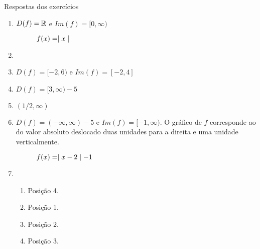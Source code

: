 \begin{frame}[allowframebreaks]{Respostas dos exercícios}
\begin{enumerate}
        \skipframe

        \item $D(f) = \mathbb{R}$ e $Im(f) = [0, \infty)$

        \begin{figure}
        \centering
        \caption{$f(x) = \mid x \mid$}
        \end{figure}

        \item <colocar gráficos>

        \skipframe

        \item $D(f) = [-2, 6)$ e $Im(f) = [-2, 4]$

        \item $D(f) = [3, \infty) - {5}$

        \item $(1/2, \infty)$

        \skipframe

        \item $D(f) = (-\infty, \infty) - {5}$ e $Im(f) = [-1, \infty)$. O gráfico de $f$ corresponde ao do valor absoluto deslocado duas unidades para a direita e uma unidade verticalmente.

        \vspace{0.5cm}

        \begin{figure}
        \centering
        \caption{$f(x) = \mid x-2 \mid-1$}
        \end{figure}

        \skipframe

        \item 
        \begin{enumerate}[a]
            \item Posição 4.
            \item Posição 1.
            \item Posição 2.
            \item Posição 3.
        \end{enumerate}


\end{enumerate}
\end{frame}
